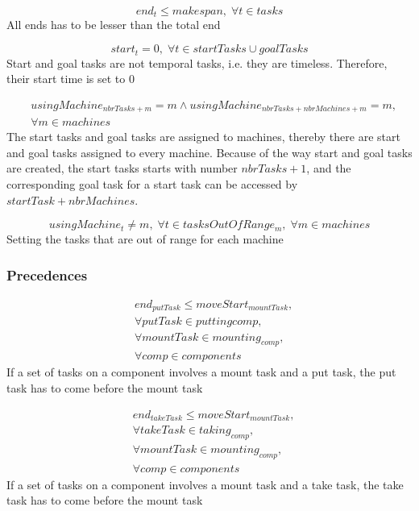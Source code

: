 \documentclass[10pt,a4paper]{report}
\begin{document}
\begin{equation}\label{eq:92}
end_t \le makespan, \; \forall t \in tasks\end{equation}
All ends has to be lesser than the total end

\begin{equation}\label{eq:93}
start_t = 0, \; \forall t \in startTasks \cup goalTasks\end{equation}
Start and goal tasks are not temporal tasks, i.e. they are timeless. Therefore, their start time is set to 0


\begin{equation}
\begin{aligned}\label{eq:94}
&usingMachine_{nbrTasks + m} = m \land usingMachine_{nbrTasks + nbrMachines + m} = m, \\
&\forall m \in machines
\end{aligned}
\end{equation}
The start tasks and goal tasks are assigned to machines, thereby there are start and goal tasks assigned to every machine. Because of the way start and goal tasks are created, the start tasks starts with number $nbrTasks + 1$, and the corresponding goal task for a start task can be accessed by $startTask + nbrMachines$.

\begin{equation}\label{eq:95}
usingMachine_t \neq m, \; \forall t \in tasksOutOfRange_m, \; \forall m \in machines\end{equation}
Setting the tasks that are out of range for each machine

\subsubsection*{Precedences}

\begin{equation}
\begin{aligned}\label{eq:96}
&end_{putTask} \le moveStart_{mountTask}, \\
&\forall putTask \in putting{comp}, \\
&\forall mountTask \in mounting_{comp}, \\
&\forall comp \in components
\end{aligned}
\end{equation}
If a set of tasks on a component involves a mount task and a put task, the put task has to come before the mount task


\begin{equation}
\begin{aligned}\label{eq:97}
&end_{takeTask} \le moveStart_{mountTask}, \\
&\forall takeTask \in taking_{comp}, \\
&\forall mountTask \in mounting_{comp}, \\
&\forall comp \in components
\end{aligned}
\end{equation}
If a set of tasks on a component involves a mount task and a take task, the take task has to come before the mount task
\end{document}
